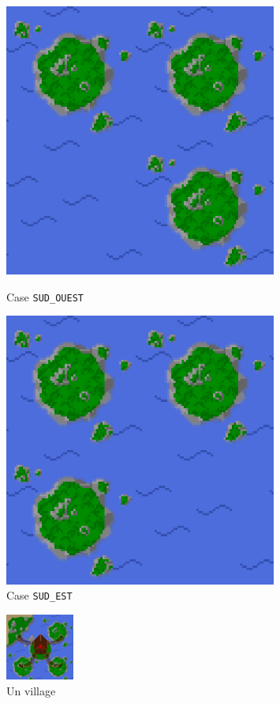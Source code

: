 \begin{figure}[h]
\begin{minipage}{0.23\textwidth}
        \centering
        \includegraphics[width=0.8\textwidth]{img/sprites/3.png}
        \caption*{Case \texttt{SUD\_OUEST}}
    \end{minipage}
    \begin{minipage}{0.23\textwidth}
        \centering
        \includegraphics[width=0.8\textwidth]{img/sprites/4.png}
        \caption*{Case \texttt{SUD\_EST}}
    \end{minipage}
\end{figure}

\begin{figure}[h]
    \centering
    \includegraphics[width=0.2\textwidth]{img/case_village.png}
    \caption*{Un village}
\end{figure}

